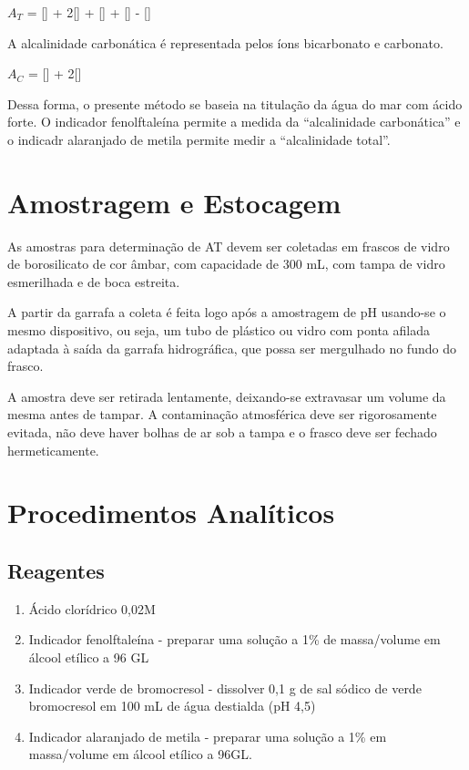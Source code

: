 \documentclass[a4paper,10pt]{SelfArx}
\begin{document}
\vspace{0.15cm}
$A_T$ = [] + 2[] + [] + [] - []
\vspace{0.15cm}

A alcalinidade carbonática é representada pelos íons bicarbonato e carbonato.

\vspace{0.15cm}
$A_C$ = [] + 2[] 
\vspace{0.15cm}

Dessa forma, o presente método se baseia na titulação da água do mar com ácido forte. O indicador fenolftaleína permite a medida da “alcalinidade carbonática” e o indicadr alaranjado de metila permite medir a “alcalinidade total”.

\section{Amostragem e Estocagem}
As amostras para determinação de AT devem ser coletadas em frascos de vidro de borosilicato de cor âmbar, com capacidade de 300 mL, com tampa de vidro esmerilhada e de boca estreita.

A partir da garrafa a coleta é feita logo após a amostragem de pH usando-se o mesmo dispositivo, ou seja, um tubo de plástico ou vidro com ponta afilada adaptada à saída da garrafa hidrográfica, que possa ser mergulhado no fundo do frasco.

A amostra deve ser retirada lentamente, deixando-se extravasar um volume da mesma antes de tampar. A contaminação atmosférica deve ser rigorosamente evitada, não deve haver bolhas de ar sob a tampa e o frasco deve ser fechado hermeticamente.
\section{Procedimentos Analíticos}

\subsection{Reagentes}

\begin{enumerate}[noitemsep]
\item Ácido clorídrico 0,02M 
\item Indicador fenolftaleína -  preparar uma solução a 1\% de massa/volume em álcool etílico a 96 GL
\item Indicador verde de bromocresol - dissolver 0,1 g de sal sódico de verde bromocresol em 100 mL de água destialda (pH 4,5)
\item Indicador alaranjado de metila - preparar uma solução a 1\% em massa/volume em álcool etílico a 96GL.
\end{enumerate}
\end{document}

